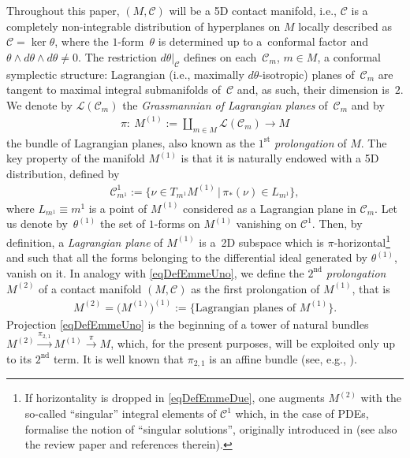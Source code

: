 \documentclass[10pt,a4paper]{amsart}
\newcommand{\C}{\mathcal{C}}
\newcommand{\St}{^\textrm{st}}
\newcommand{\Nd}{^\textrm{nd}}
\newcommand{\w}{\nu}
\numberwithin{equation}{section}
\begin{document}
Throughout this paper, $(M,\C)$ will be a 5D contact manifold, i.e., $\C$ is a completely non-integrable distribution of hyperplanes on $M$ locally described as $\C=\ker\theta$, where the $1$-form~$\theta$ is determined up to a~conformal factor and $\theta\wedge d\theta\wedge d\theta\neq 0$. The restriction $d \theta|_{\mathcal{C}}$
def\/ines on each~$\mathcal{C}_m$, $m\in M$, a conformal symplectic structure: Lagrangian (i.e., maximally $d\theta$-isotropic) planes of~$\mathcal{C}_m$ are tangent to maximal integral submanifolds of~$\mathcal{C}$ and, as such, their dimension is~$2$. We denote by $\mathcal{L}(\mathcal{C}_m)$ the \emph{Grassmannian of Lagrangian planes} of~$\mathcal{C}_m$ and by
\begin{gather}\label{eqDefEmmeUno}
\pi\colon \ M^{(1)} := \coprod_{m \in M}\mathcal{L}(\mathcal{C}_m) \to M
\end{gather}
the bundle of Lagrangian planes, also known as the $1\St$ \emph{prolongation} of $M$. The key property of the manifold $M^{(1)}$ is that it is naturally endowed
with a 5D distribution, def\/ined by
\begin{gather*}
\mathcal{C}^{1}_{m^1}:=\big\{\w\in T_{m^1}M^{(1)}\,|\,
\pi_{*}(\w)\in L_{m^1}\big\},\end{gather*}
where $L_{m^1}\equiv m^1$ is a point of $M^{(1)}$ considered as
a Lagrangian plane in $\mathcal{C}_{m}$.
Let us denote by~$\theta^{(1)}$ the set of $1$-forms on $M^{(1)}$ vanishing on $\mathcal{C}^{1}$. Then, by def\/inition, a \emph{Lagrangian plane} of $M^{(1)}$ is a~2D subspace which is $\pi$-horizontal\footnote{If horizontality is dropped in \eqref{eqDefEmmeDue}, one augments $M^{(2)}$ with the so-called ``singular'' integral elements of $\C^1$ which, in the case of PDEs, formalise the notion of ``singular solutions'', originally introduced in \cite{MR966202} (see also the review paper \cite{LucaChar} and references therein).} and such that all the forms belonging to the dif\/ferential ideal generated by $\theta^{(1)}$, vanish on it. In analogy with \eqref{eqDefEmmeUno}, we def\/ine the $2\Nd$ \emph{prolongation} $M^{(2)}$ of a contact
manifold $(M, \mathcal{C})$ as the f\/irst prolongation of $M^{(1)}$, that is
\begin{gather}\label{eqDefEmmeDue}
M^{(2)}=\big(M^{(1)}\big)^{(1)}:=\big\{ \text{Lagrangian planes of $M^{(1)}$} \big\}.
\end{gather}
Projection \eqref{eqDefEmmeUno} is the beginning of a tower of natural bundles $M^{(2)} \overset{\pi_{2,1}}{\longrightarrow} M^{(1)} \overset{\pi}{\longrightarrow} M
$,
which, for the present purposes, will be exploited only up to its $2\Nd$ term.
It is well known that $\pi_{2,1}$ is an af\/f\/ine bundle (see, e.g., \cite{MR1202431}).
\end{document}
